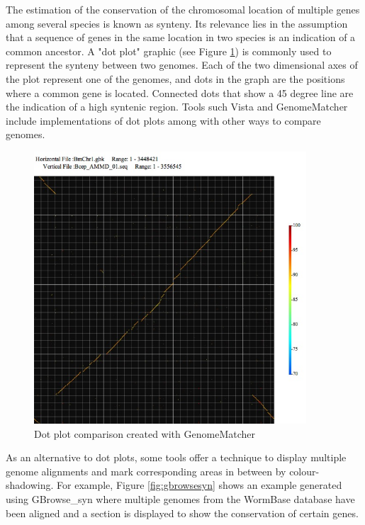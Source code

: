 The estimation of the conservation of the chromosomal location of multiple genes among several species is known as synteny. Its relevance lies in the assumption that a sequence of genes in the same location in two species is an indication of a common ancestor. A "dot plot" graphic (see Figure \ref{fig:dotplot}) is commonly used to represent the synteny between two genomes. Each of the two dimensional axes of the plot represent one of the genomes, and dots in the graph are the positions where a common gene is located. Connected dots that show a 45 degree line are the indication of a high syntenic region. Tools such Vista \cite{FRA2004} and GenomeMatcher \cite{OHT2008} include implementations of dot plots among with other ways to compare genomes.

\begin{figure}  
\centering
\includegraphics[width=4in]{figures/dotplot.jpg}
\caption[Dot plot comparison created with GenomeMatcher.]{Dot plot comparison created with GenomeMatcher
\label{fig:dotplot}}
\end{figure}

As an alternative to dot plots, some tools offer a technique to display multiple genome alignments and mark corresponding areas in between by colour-shadowing. For example, Figure \ref{fig:gbrowsesyn} shows an example generated using GBrowse\_syn \cite{MCK2010} where multiple genomes from the WormBase database have been aligned and a section is displayed to show the conservation of certain genes.

